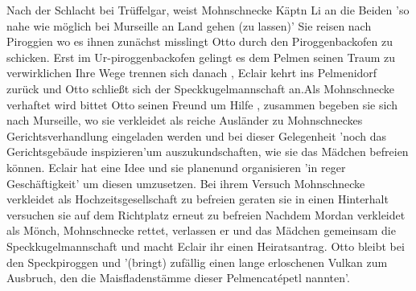 {Nach der Schlacht bei Trüffelgar, weist Mohnschnecke Käptn Li an die Beiden 'so nahe wie möglich bei Murseille an Land gehen (zu lassen)'\cite[S.464]{pir} Sie reisen nach Piroggien \cite[S.479]{pir} wo es ihnen zunächst misslingt Otto durch den Piroggenbackofen zu schicken\cite[S.488]{pir}. Erst im Ur-piroggenbackofen \cite[S.494]{pir} gelingt es dem Pelmen seinen Traum zu verwirklichen\cite[S.497ff]{pir} Ihre Wege trennen sich danach \cite[S.504f]{pir}, Eclair kehrt ins Pelmenidorf zurück \cite[S.515]{pir} und Otto schließt sich der Speckkugelmannschaft an.\cite[S.523ff]{pir}Als Mohnschnecke verhaftet wird \cite[S.550]{pir} bittet Otto seinen Freund um Hilfe \cite[S.555]{pir}, zusammen begeben sie sich nach Murseille, wo sie verkleidet als reiche Ausländer\cite[S.565]{pir} zu Mohnschneckes Gerichtsverhandlung eingeladen werden\cite[S.568]{pir} und bei dieser Gelegenheit 'noch das Gerichtsgebäude inspizieren'\cite[S.577]{pir}um auszukundschaften, wie sie das Mädchen befreien können.\cite[S.569ff]{pir} Eclair hat eine Idee\cite[S.580]{pir} und sie planen\cite[S.581]{pir}und organisieren 'in reger Geschäftigkeit'\cite[S.584]{pir} um diesen umzusetzen. Bei ihrem Versuch Mohnschnecke verkleidet als Hochzeitsgesellschaft zu befreien\cite[S.584ff]{pir} geraten sie in einen Hinterhalt\cite[S.593]{pir} versuchen sie auf dem Richtplatz erneut zu befreien\cite[S.607ff]{pir} Nachdem Mordan verkleidet als Mönch, Mohnschnecke rettet, \cite[S.614]{pir} verlassen er und das Mädchen gemeinsam die Speckkugelmannschaft\cite[S.639]{pir} und macht Eclair ihr einen Heiratsantrag. \cite[S.640]{pir} Otto bleibt bei den Speckpiroggen \cite[S.638]{pir} und '(bringt) zufällig einen lange erloschenen Vulkan zum Ausbruch, den die Maisfladenstämme dieser Pelmencatépetl nannten'.\cite[S.646]{pir}

}
